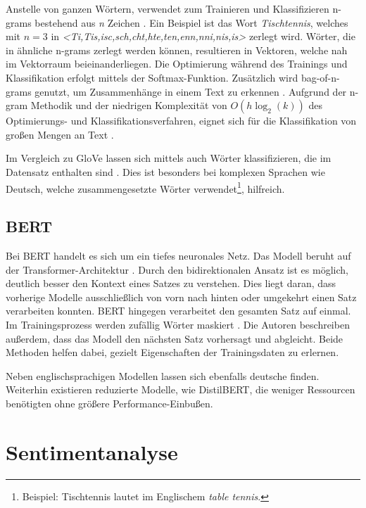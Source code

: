 Anstelle von ganzen Wörtern, verwendet \ft zum Trainieren und Klassifizieren n-grams bestehend aus \textit{n} Zeichen \autocite{kowsari_text_2019, joulin_fasttextzip_2016}. Ein Beispiel ist das Wort \textit{Tischtennis}, welches mit \(n = 3\) in \textit{<Ti,Tis,isc,sch,cht,hte,ten,enn,nni,nis,is>} zerlegt wird. Wörter, die in ähnliche n-grams zerlegt werden können, resultieren in Vektoren, welche nah im Vektorraum beieinanderliegen. Die Optimierung während des Trainings und Klassifikation erfolgt mittels der Softmax-Funktion. Zusätzlich wird bag-of-n-grams genutzt, um Zusammenhänge in einem Text zu erkennen \autocite[2]{joulin_bag_2016}. Aufgrund der n-gram Methodik und der niedrigen Komplexität von \(O(h \log_{2}(k))\) des Optimierungs- und Klassifikationsverfahren, eignet sich \ft für die Klassifikation von großen Mengen an Text \autocite[2\psqq]{joulin_bag_2016}.

Im Vergleich zu \ac{GloVe} lassen sich mittels \ft auch Wörter klassifizieren, die im Datensatz enthalten sind \autocite{guhr_training_2020, bojanowski_enriching_2017}. Dies ist besonders bei komplexen Sprachen wie Deutsch, welche zusammengesetzte Wörter verwendet\footnote{Beispiel: Tischtennis lautet im Englischem \textit{table tennis}.}, hilfreich.

\subsection*{BERT}

Bei \ac{BERT} handelt es sich um ein tiefes neuronales Netz. Das Modell beruht auf der Transformer-Architektur \autocite[3]{devlin_bert_2019}. Durch den bidirektionalen Ansatz ist es möglich, deutlich besser den Kontext eines Satzes zu verstehen. Dies liegt daran, dass vorherige Modelle ausschließlich von vorn nach hinten oder umgekehrt einen Satz verarbeiten konnten. \ac{BERT} hingegen verarbeitet den gesamten Satz auf einmal. Im Trainingsprozess werden zufällig Wörter maskiert \autocite[4]{devlin_bert_2019}. Die Autoren beschreiben außerdem, dass das Modell den nächsten Satz vorhersagt und abgleicht. Beide Methoden helfen dabei, gezielt Eigenschaften der Trainingsdaten zu erlernen.

Neben englischsprachigen Modellen lassen sich ebenfalls deutsche finden. Weiterhin existieren reduzierte Modelle, wie DistilBERT, die weniger Ressourcen benötigten ohne größere Performance-Einbußen. 

\section{Sentimentanalyse} \label{sec:sentimentanalysis}

